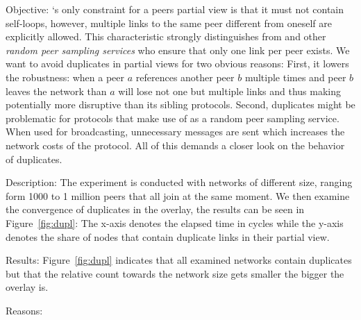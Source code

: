 \begin{asparadesc} 
\item[Objective:]
    \SCAMPLON{}`s only constraint for a peers partial view is that it must not contain
    self-loops, however, multiple links to the same peer different from oneself
    are explicitly allowed.
    This characteristic strongly distinguishes \SCAMPLON{} from \CYCLON{} and other 
    \emph{random peer sampling services} who ensure that only one link per peer exists.
    We want to avoid duplicates in partial views for two obvious reasons:
    First, it lowers the robustness: when a peer $a$ references another peer $b$ 
    multiple times and peer $b$ leaves the network than $a$ will lose not one but 
    multiple links and thus making \SCAMPLON{} potentially more disruptive than 
    its sibling protocols.
    Second, duplicates might be problematic for protocols that make use of \SCAMPLON{} as
    a random peer sampling service. When used for broadcasting, unnecessary messages
    are sent which increases the network costs of the protocol.
    All of this demands a closer look on the behavior of duplicates.
\item[Description:]
    The experiment is conducted with networks of different size, ranging form 1000 
    to 1 million peers that all join at the same moment. We then examine the convergence
    of duplicates in the overlay, the results can be seen in Figure~\ref{fig:dupl}:
    The x-axis denotes the elapsed time in cycles while the y-axis denotes the share of
    nodes that contain duplicate links in their partial view.
\item[Results:]
    Figure~\ref{fig:dupl} indicates that all examined networks contain duplicates but
    that the relative count towards the network size gets smaller the bigger the overlay
    is. 
\item[Reasons:]

\end{asparadesc}


